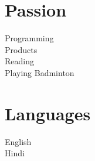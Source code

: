 \documentclass[]{gagan-resume}
\begin{document}
\begin{minipage}[t]{0.33\textwidth}

\vspace{\topsep}
\vspace{\topsep}
\vspace{\topsep}
\vspace{\topsep}



\section{Passion}
Programming \\
Products \\
Reading \\
Playing Badminton \\
\sectionsep



\section{Languages}
English \\
Hindi \\
\sectionsep



\end{minipage} 
\hfill
\end{document}
